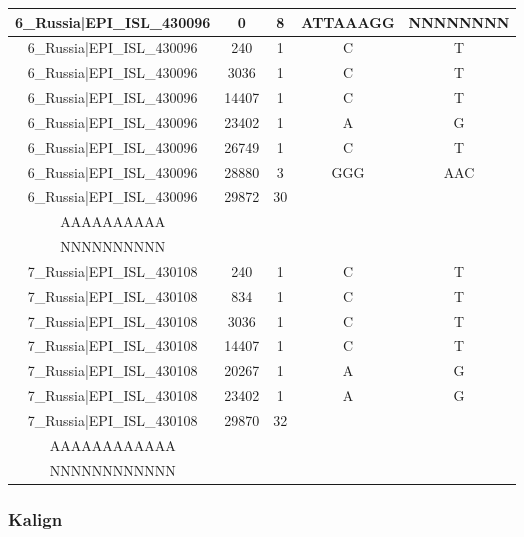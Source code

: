 \documentclass[a4paper,10pt]{article}
\begin{document}
\begin{longtable}{@{}ccccc@{}}
6\_Russia|EPI\_ISL\_430096 & 0 & 8 & ATTAAAGG & NNNNNNNN \\* \midrule
6\_Russia|EPI\_ISL\_430096 & 240 & 1 & C & T \\* \midrule
6\_Russia|EPI\_ISL\_430096 & 3036 & 1 & C & T \\* \midrule
6\_Russia|EPI\_ISL\_430096 & 14407 & 1 & C & T \\* \midrule
6\_Russia|EPI\_ISL\_430096 & 23402 & 1 & A & G \\* \midrule
6\_Russia|EPI\_ISL\_430096 & 26749 & 1 & C & T \\* \midrule
6\_Russia|EPI\_ISL\_430096 & 28880 & 3 & GGG & AAC \\* \midrule
6\_Russia|EPI\_ISL\_430096 & 29872 & 30 & \begin{tabular}[c]{@{}c@{}}AAAAAAAAAAAAAAAAAAAA\\ AAAAAAAAAA\end{tabular} & \begin{tabular}[c]{@{}c@{}}NNNNNNNNNNNNNNNNNNNN\\ NNNNNNNNNN\end{tabular} \\* \midrule
7\_Russia|EPI\_ISL\_430108 & 240 & 1 & C & T \\* \midrule
7\_Russia|EPI\_ISL\_430108 & 834 & 1 & C & T \\* \midrule
7\_Russia|EPI\_ISL\_430108 & 3036 & 1 & C & T \\* \midrule
7\_Russia|EPI\_ISL\_430108 & 14407 & 1 & C & T \\* \midrule
7\_Russia|EPI\_ISL\_430108 & 20267 & 1 & A & G \\* \midrule
7\_Russia|EPI\_ISL\_430108 & 23402 & 1 & A & G \\* \midrule
7\_Russia|EPI\_ISL\_430108 & 29870 & 32 & \begin{tabular}[c]{@{}c@{}}AAAAAAAAAAAAAAAAAAAA\\ AAAAAAAAAAAA\end{tabular} & \begin{tabular}[c]{@{}c@{}}NNNNNNNNNNNNNNNNNNNN\\ NNNNNNNNNNNN\end{tabular} \\* \bottomrule
\end{longtable}

\newpage
\subsubsection{Kalign}
\end{document}

